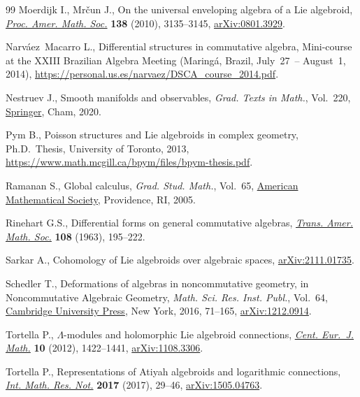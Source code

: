 \documentclass[pdftex]{sigma}
\numberwithin{equation}{section}
\theoremstyle{definition}
\begin{document}
\begin{thebibliography}{99}
Moerdijk I., Mr\v{c}un J., On the universal enveloping algebra of a {L}ie
 algebroid, \href{https://doi.org/10.1090/S0002-9939-10-10347-5}{\textit{Proc.
 Amer. Math. Soc.}} \textbf{138} (2010), 3135--3145,
 \href{http://arxiv.org/abs/0801.3929}{arXiv:0801.3929}.

Narv\'{a}ez~Macarro L., Differential structures in commutative algebra,
 {M}ini-course at the XXIII Brazilian Algebra Meeting (Maring\'a, Brazil, July~27~-- August~1, 2014),
 \url{https://personal.us.es/narvaez/DSCA_course_2014.pdf}.

Nestruev J., Smooth manifolds and observables, \textit{Grad. Texts in Math.},
 Vol.~220, \href{https://doi.org/10.1007/978-3-030-45650-4}{Springer}, Cham,
 2020.

Pym B., Poisson structures and {L}ie algebroids in complex geometry, Ph.D.~Thesis, {U}niversity of {T}oronto, 2013,
 \url{https://www.math.mcgill.ca/bpym/files/bpym-thesis.pdf}.

Ramanan S., Global calculus, \textit{Grad. Stud. Math.}, Vol.~65,
 \href{https://doi.org/10.1090/gsm/065}{American Mathematical Society},
 Providence, RI, 2005.

Rinehart G.S., Differential forms on general commutative algebras,
 \href{https://doi.org/10.2307/1993603}{\textit{Trans. Amer. Math. Soc.}}
 \textbf{108} (1963), 195--222.

Sarkar A., Cohomology of {L}ie algebroids over algebraic spaces,
 \href{http://arxiv.org/abs/2111.01735}{arXiv:2111.01735}.

Schedler T., Deformations of algebras in noncommutative geometry, in
 Noncommutative Algebraic Geometry, \textit{Math. Sci. Res. Inst. Publ.},
 Vol.~64, \href{https://doi.org/10.1017/9781316416570.004}{Cambridge
 University Press}, New York, 2016, 71--165,
 \href{http://arxiv.org/abs/1212.0914}{arXiv:1212.0914}.

Tortella P., {$\Lambda$}-modules and holomorphic {L}ie algebroid connections,
 \href{https://doi.org/10.2478/s11533-012-0065-z}{\textit{Cent. Eur.~J.
 Math.}} \textbf{10} (2012), 1422--1441,
 \href{http://arxiv.org/abs/1108.3306}{arXiv:1108.3306}.

Tortella P., Representations of {A}tiyah algebroids and logarithmic
 connections, \href{https://doi.org/10.1093/imrn/rnw010}{\textit{Int. Math.
 Res. Not.}} \textbf{2017} (2017), 29--46,
 \href{http://arxiv.org/abs/1505.04763}{arXiv:1505.04763}.


\end{thebibliography}
\end{document}
